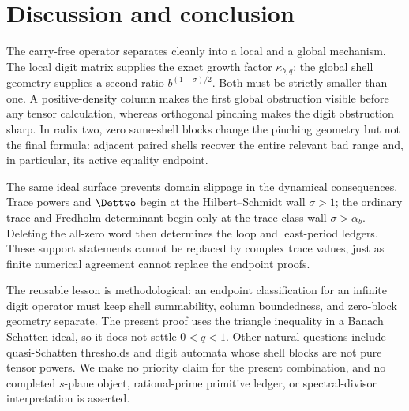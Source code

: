 \section{Discussion and conclusion}
\label{sec:conclusion}

The carry-free operator separates cleanly into a local and a global
mechanism.  The local digit matrix supplies the exact growth factor
\(\kappa_{b,q}\); the global shell geometry supplies a second ratio
\(b^{(1-\sigma)/2}\).  Both must be strictly smaller than one.  A
positive-density column makes the first global obstruction visible before
any tensor calculation, whereas orthogonal pinching makes the digit
obstruction sharp.  In radix two, zero same-shell blocks change the
pinching geometry but not the final formula: adjacent paired shells recover
the entire relevant bad range and, in particular, its active equality
endpoint.

The same ideal surface prevents domain slippage in the dynamical
consequences.  Trace powers and \(\Dettwo\) begin at the
Hilbert--Schmidt wall \(\sigma>1\); the ordinary trace and Fredholm
determinant begin only at the trace-class wall
\(\sigma>\alpha_b\).  Deleting the all-zero word then determines the loop
and least-period ledgers.  These support statements cannot be replaced by
complex trace values, just as finite numerical agreement cannot replace
the endpoint proofs.

The reusable lesson is methodological: an endpoint classification for an
infinite digit operator must keep shell summability, column boundedness,
and zero-block geometry separate.  The present proof uses the triangle
inequality in a Banach Schatten ideal, so it does not settle
\(0<q<1\).  Other natural questions include quasi-Schatten thresholds and
digit automata whose shell blocks are not pure tensor powers.  We make no
priority claim for the present combination, and no completed
\(s\)-plane object, rational-prime primitive ledger, or spectral-divisor
interpretation is asserted.
